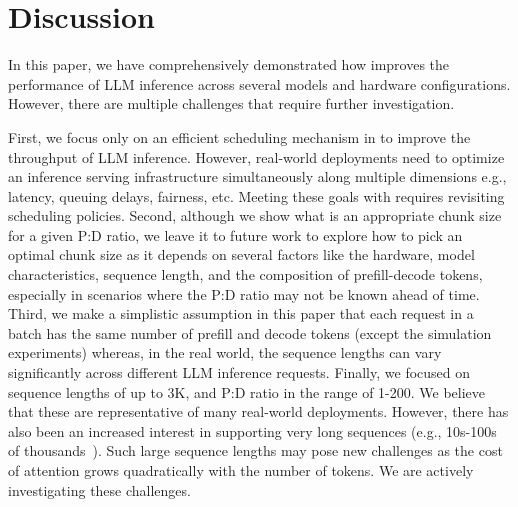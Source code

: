 \section{Discussion} \label{sec:discussion}
In this paper, we have comprehensively demonstrated how \sysname improves the performance of LLM inference across several models and hardware configurations. However, there are multiple challenges that require further investigation.

First, we focus only on an efficient scheduling mechanism in \sysname to improve the throughput of LLM inference. However, real-world deployments need to optimize an inference serving infrastructure simultaneously along multiple dimensions e.g., latency, queuing delays, fairness, etc. Meeting these goals with \sysname requires revisiting scheduling policies. Second, although we show what is an appropriate chunk size for a given P:D ratio, we leave it to future work to explore how to pick an optimal chunk size as it depends on several factors like the hardware, model characteristics, sequence length, and the composition of prefill-decode tokens, especially in scenarios where the P:D ratio may not be known ahead of time. Third, we make a simplistic assumption in this paper that each request in a batch has the same number of prefill and decode tokens (except the simulation experiments) whereas, in the real world, the sequence lengths can vary significantly across different LLM inference requests. Finally, we focused on sequence lengths of up to 3K, and P:D ratio in the range of 1-200. We believe that these are representative of many real-world deployments. However, there has also been an increased interest in supporting very long sequences (e.g., 10s-100s of thousands~\cite{largecontextlength}). Such large sequence lengths may pose new challenges as the cost of attention grows quadratically with the number of tokens. We are actively investigating these challenges. 




